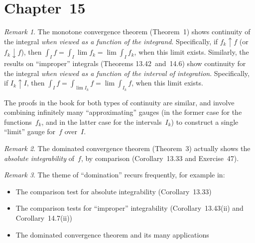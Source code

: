 \documentclass[letterpaper,12pt]{article}
\newcommand{\upto}{\uparrow}
\newcommand{\downto}{\downarrow}
\theoremstyle{plain}
\theoremstyle{definition}
\theoremstyle{remark}
\newtheorem*{rmk}{Remark}
\begin{document}
\section*{Chapter~15}
\begin{rmk}
The monotone convergence theorem (Theorem~1) shows continuity of the integral \emph{when viewed as a function of the integrand}. Specifically, if \(f_k\upto f\) (or \(f_k\downto f\)), then \(\int_I f=\int_I\lim f_k=\lim\int_I f_k\), when this limit exists. Similarly, the results on ``improper'' integrals (Theorems 13.42~and~14.6) show continuity for the integral \emph{when viewed as a function of the interval of integration}. Specifically, if \(I_k\upto I\), then \(\int_I f=\int_{\lim I_k}f=\lim\int_{I_k}f\), when this limit exists.

The proofs in the book for both types of continuity are similar, and involve combining infinitely many ``approximating'' gauges (in the former case for the functions~\(f_k\), and in the latter case for the intervals~\(I_k\)) to construct a single ``limit'' gauge for~\(f\) over~\(I\).
\end{rmk}

\begin{rmk}
The dominated convergence theorem (Theorem~3) actually shows the \emph{absolute integrability} of~\(f\), by comparison (Corollary~13.33 and Exercise~47).
\end{rmk}

\begin{rmk}
The theme of ``domination'' recurs frequently, for example in:
\begin{itemize}[itemsep=0pt]
\item The comparison test for absolute integrability (Corollary~13.33)
\item The comparison tests for ``improper'' integrability (Corollary~13.43(ii) and Corollary~14.7(ii))
\item The dominated convergence theorem and its many applications
\end{itemize}
\end{rmk}
\end{document}
